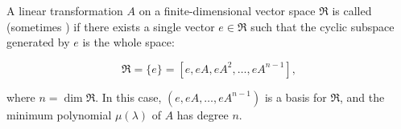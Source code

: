 A linear transformation $A$ on a finite-dimensional vector space $\Re$ is called  (sometimes ) if there exists a single vector $e \in \Re$ such that the cyclic subspace generated by $e$ is the whole space:

$$\Re = \{e\} = [e, eA, eA^2, \dots, eA^{n-1}],$$

where $n = \dim \Re$. In this case, $(e, eA, \dots, eA^{n-1})$ is a basis for $\Re$, and the minimum polynomial $\mu(\lambda)$ of $A$ has degree $n$.
